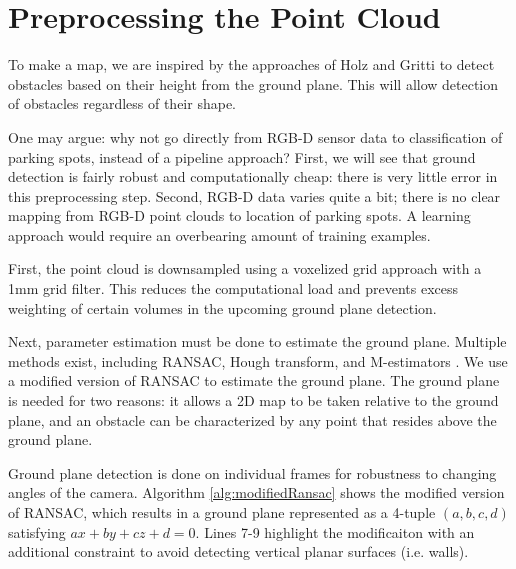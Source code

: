 \section{Preprocessing the Point Cloud}
\label{sec:processingPointCloud}
To make a map, we are inspired by the approaches of Holz \cite{holz2013towards}
and Gritti \cite{gritti2014kinect} to detect obstacles based on their height
from the ground plane. This will allow detection of obstacles regardless of
their shape.

One may argue: why not go directly from RGB-D sensor data to classification of
parking spots, instead of a pipeline approach?
First, we will see that ground detection is fairly robust and computationally
cheap: there is very little error in this preprocessing step.
Second, RGB-D data varies quite a bit; there is no clear mapping from RGB-D
point clouds to location of parking spots. A learning approach would require an
overbearing amount of training examples.

First, the point cloud is downsampled using a voxelized grid approach with a 1mm
grid filter. This reduces the computational load and prevents excess weighting of
certain volumes in the upcoming ground plane detection.

Next, parameter estimation must be done to estimate the ground plane. Multiple methods
exist, including RANSAC, Hough transform, and M-estimators
\cite{holz2013towards}.
We use a modified version of RANSAC to estimate the ground plane. The
ground plane is needed for two reasons:
it allows a 2D map to be taken relative to the ground plane, and an obstacle can
be characterized by any point that resides above the ground plane.

Ground plane detection is done on individual frames for robustness to changing
angles of the camera.
Algorithm \autoref{alg:modifiedRansac} shows the modified version of RANSAC,
which results in a ground plane represented as a 4-tuple $(a,b,c,d)$ satisfying
$ax + by + cz + d = 0$. Lines 7-9 highlight the modificaiton with an additional
constraint to avoid detecting vertical planar surfaces (i.e. walls).


